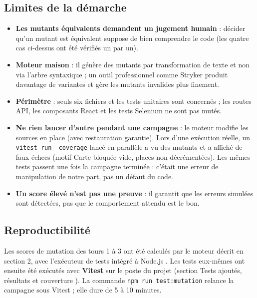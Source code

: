 \documentclass[12pt,a4paper]{article}
\begin{document}
\subsection{Limites de la démarche}
\begin{itemize}
    \item \textbf{Les mutants équivalents demandent un jugement humain} : décider qu'un mutant est équivalent suppose de bien comprendre le code (les quatre cas ci-dessus ont été vérifiés un par un).
    \item \textbf{Moteur maison} : il génère des mutants par transformation de texte et non via l'arbre syntaxique ; un outil professionnel comme Stryker produit davantage de variantes et gère les mutants invalides plus finement.
    \item \textbf{Périmètre} : seuls six fichiers et les tests unitaires sont concernés ; les routes API, les composants React et les tests Selenium ne sont pas mutés.
    \item \textbf{Ne rien lancer d'autre pendant une campagne} : le moteur modifie les sources en place (avec restauration garantie). Lors d'une exécution réelle, un \texttt{vitest run --coverage} lancé en parallèle a vu des mutants et a affiché de faux échecs (motif \og Carte bloquée \fg{} vide, places non décrémentées). Les mêmes tests passent une fois la campagne terminée : c'était une erreur de manipulation de notre part, pas un défaut du code.
    \item \textbf{Un score élevé n'est pas une preuve} : il garantit que les erreurs simulées sont détectées, pas que le comportement attendu est le bon.
\end{itemize}

\subsection{Reproductibilité}
Les scores de mutation des tours 1 à 3 ont été calculés par le moteur décrit en section 2, avec l'exécuteur de tests intégré à Node.js . Les tests eux-mêmes ont ensuite été exécutés avec \textbf{Vitest} sur le poste du projet (section \og Tests ajoutés, résultats et couverture \fg{}). La commande \texttt{npm run test:mutation} relance la campagne sous Vitest ; elle dure de 5 à 10 minutes.

\end{document}
